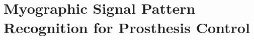 \chapter{Myographic Signal Pattern Recognition for Prosthesis Control}
\label{chap:myographic_signal_pattern_recognition}
%
%
%
%
%
%
%
%
%
%
%
